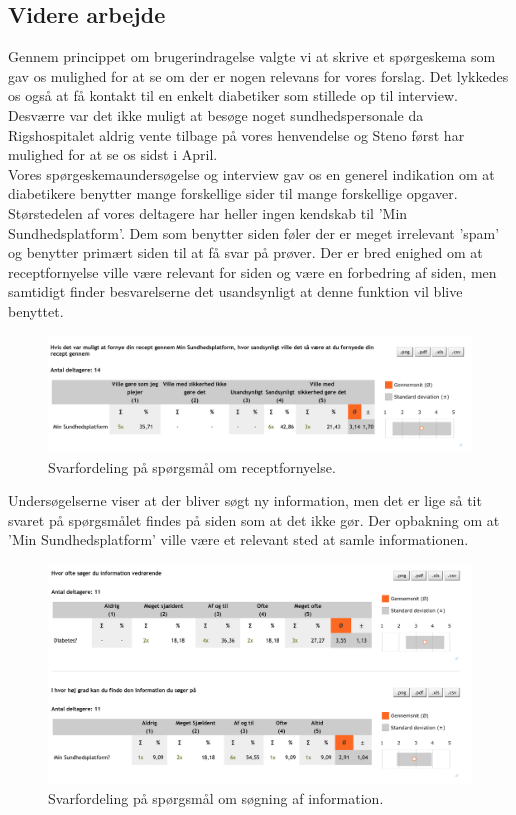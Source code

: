 \subsection{Videre arbejde}
Gennem princippet om brugerindragelse valgte vi at skrive et spørgeskema som gav os mulighed for at se om der er nogen relevans for vores forslag. Det lykkedes os også at få kontakt til en enkelt diabetiker som stillede op til interview. Desværre var det ikke muligt at besøge noget sundhedspersonale da Rigshospitalet aldrig vente tilbage på vores henvendelse og Steno først har mulighed for at se os sidst i April.\\
Vores spørgeskemaundersøgelse og interview gav os en generel indikation om at diabetikere benytter mange forskellige sider til mange forskellige opgaver. Størstedelen af vores deltagere har heller ingen kendskab til 'Min Sundhedsplatform'. Dem som benytter siden føler der er meget irrelevant 'spam' og benytter primært siden til at få svar på prøver. Der er bred enighed om at receptfornyelse ville være relevant for siden og være en forbedring af siden, men samtidigt finder besvarelserne det usandsynligt at denne funktion vil blive benyttet.

\begin{figure}[H]
	\centering
	\includegraphics[width=\textwidth]{Materials/Receptfornyelse}
	\caption{Svarfordeling på spørgsmål om receptfornyelse.}
\end{figure}

Undersøgelserne viser at der bliver søgt ny information, men det er lige så tit svaret på spørgsmålet findes på siden som at det ikke gør. Der opbakning om at 'Min Sundhedsplatform' ville være et relevant sted at samle informationen.
 
\begin{figure}[H]
	\centering
	\includegraphics[width=\textwidth]{Materials/SeekingInformation}
	\caption{Svarfordeling på spørgsmål om søgning af information.}
\end{figure}

